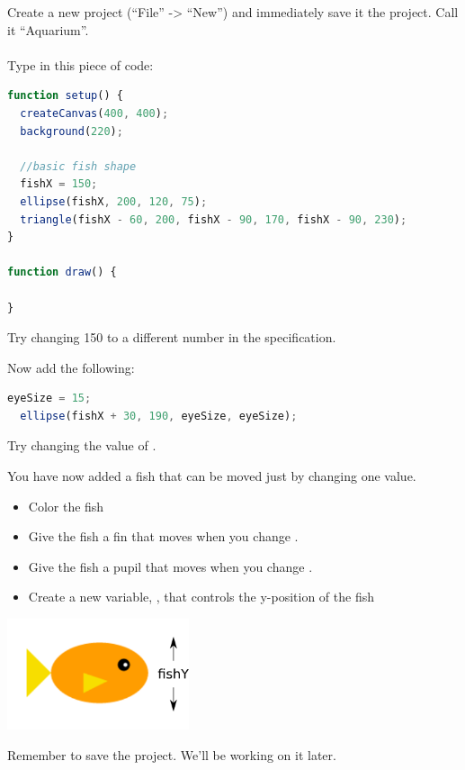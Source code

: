 
\newpage
{}
\begin{exercisebox}[adjusted title=Variables]
Create a new project (``File'' -> ``New'') and immediately save it
the project. Call it ``Aquarium''.\\
\\
\noindent
Type in this piece of code:

\begin{lstlisting}[language=JavaScript]
function setup() {
  createCanvas(400, 400);
  background(220);
  
  //basic fish shape
  fishX = 150;
  ellipse(fishX, 200, 120, 75);
  triangle(fishX - 60, 200, fishX - 90, 170, fishX - 90, 230);
}

function draw() {
 
}

\end{lstlisting}
Try changing 150 to a different number in the  specification.

\noindent
Now add the following:
\begin{lstlisting}[language=JavaScript]
  eyeSize = 15;
  ellipse(fishX + 30, 190, eyeSize, eyeSize);
\end{lstlisting}
Try changing the value of .

\noindent
You have now added a fish that can be moved just by changing one
value.

\begin{itemize}
\item Color the fish
\item Give the fish a fin that moves when you change .
\item Give the fish a pupil that moves when you change .
\item Create a new variable, , that controls the y-position of the fish
\end{itemize}

\hspace{1cm}\includegraphics[width=0.4\textwidth]{illustrationer/fisk-fishY.png}

\noindent
Remember to save the project. We'll be working on it later.

\end{exercisebox}
